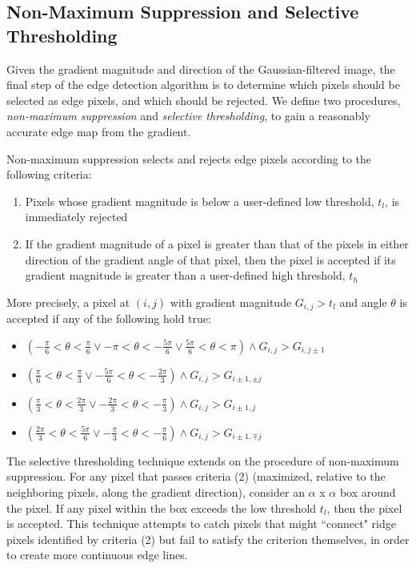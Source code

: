 \documentclass[journal]{IEEEtran}
\begin{document}
\subsection{Non-Maximum Suppression and Selective Thresholding}
Given the gradient magnitude and direction of the Gaussian-filtered image, the final step of the edge detection algorithm is to determine which pixels should be selected as edge pixels, and which should be rejected. We define two procedures, \textit{non-maximum suppression} and \textit{selective thresholding}, to gain a reasonably accurate edge map from the gradient.
\par Non-maximum suppression selects and rejects edge pixels according to the following criteria:
\begin{enumerate}
	\item Pixels whose gradient magnitude is below a user-defined low threshold, $t_l$, is immediately rejected
	\item If the gradient magnitude of a pixel is greater than that of the pixels in either direction of the gradient angle of that pixel, then the pixel is accepted if its gradient magnitude is greater than a user-defined high threshold, $t_h$
\end{enumerate}
More precisely, a pixel at $(i, j)$ with gradient magnitude $G_{i, j} > t_l$ and angle $\theta$ is accepted if any of the following hold true:
\begin{itemize}
	\item $(-\frac{\pi}{6} < \theta < \frac{\pi}{6} \vee -\pi < \theta < -\frac{5 \pi}{6} \vee \frac{5\pi}{6} < \theta < \pi) \wedge G_{i, j} > G_{i, j \pm 1}$
	\item $(\frac{\pi}{6} < \theta < \frac{\pi}{3} \vee -\frac{5 \pi}{6} < \theta < -\frac{2 \pi}{3}) \wedge G_{i, j} > G_{i \pm 1, \pm j}$
	\item $(\frac{\pi}{3} < \theta < \frac{2 \pi}{3} \vee -\frac{2 \pi}{3} < \theta < -\frac{\pi}{3}) \wedge G_{i, j} > G_{i \pm 1, j}$
	\item $(\frac{2 \pi}{3} < \theta < \frac{5 \pi}{6} \vee -\frac{\pi}{3} < \theta < -\frac{\pi}{6}) \wedge G_{i, j} > G_{i \pm 1, \mp j}$
\end{itemize}
The selective thresholding technique extends on the procedure of non-maximum suppression. For any pixel that passes criteria (2) (maximized, relative to the neighboring pixels, along the gradient direction), consider an $\alpha$ x $\alpha$ box around the pixel. If any pixel within the box exceeds the low threshold $t_l$, then the pixel is accepted. This technique attempts to catch pixels that might ``connect" ridge pixels identified by criteria (2) but fail to satisfy the criterion themselves, in order to create more continuous edge lines.
\end{document}

